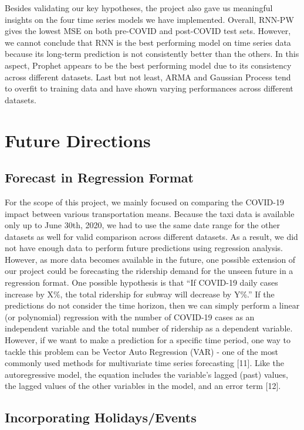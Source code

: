 \documentclass{article}
\begin{document}
Besides validating our key hypotheses, the project also gave us meaningful insights on the four time series models we have implemented. Overall, RNN-PW gives the lowest MSE on both pre-COVID and post-COVID test sets. However, we cannot conclude that RNN is the best performing model on time series data because its long-term prediction is not consistently better than the others. In this aspect, Prophet appears to be the best performing model due to its consistency across different datasets. Last but not least, ARMA and Gaussian Process tend to overfit to training data and have shown varying performances across different datasets.

\section{Future Directions}
\subsection{Forecast in Regression Format}

For the scope of this project, we mainly focused on comparing the COVID-19 impact between various transportation means. Because the taxi data is available only up to June 30th, 2020, we had to use the same date range for the other datasets as well for valid comparison across different datasets. As a result, we did not have enough data to perform future predictions using regression analysis. However, as more data becomes available in the future, one possible extension of our project could be forecasting the ridership demand for the unseen future in a regression format. One possible hypothesis is that “If COVID-19 daily cases increase by X\%, the total ridership for subway will decrease by Y\%.” If the predictions do not consider the time horizon, then we can simply perform a linear (or polynomial) regression with the number of COVID-19 cases as an independent variable and the total number of ridership as a dependent variable. However, if we want to make a prediction for a specific time period, one way to tackle this problem can be Vector Auto Regression (VAR) - one of the most commonly used methods for multivariate time series forecasting [11]. Like the autoregressive model, the equation includes the variable's lagged (past) values, the lagged values of the other variables in the model, and an error term [12].

\subsection{Incorporating Holidays/Events}
\end{document}
